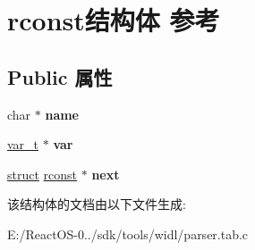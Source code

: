 \hypertarget{structrconst}{}\section{rconst结构体 参考}
\label{structrconst}
\subsection*{Public 属性}
\begin{DoxyCompactItemize}
\item 
\mbox{\label{structrconst_ab27727ec93bdce5183f3459d703dd5cd}} 
char $\ast$ {\bfseries name}
\item 
\mbox{\label{structrconst_a4a36ff53b8d86b1df3382b1880347ea2}} 
\hyperlink{struct__var__t}{var\+\_\+t} $\ast$ {\bfseries var}
\item 
\mbox{\label{structrconst_af0797a3b34f6c56923ac69e129ac6cc8}} 
\hyperlink{interfacestruct}{struct} \hyperlink{structrconst}{rconst} $\ast$ {\bfseries next}
\end{DoxyCompactItemize}


该结构体的文档由以下文件生成\+:\begin{DoxyCompactItemize}
\item 
E\+:/\+React\+O\+S-\/0../sdk/tools/widl/parser.\+tab.\+c\end{DoxyCompactItemize}
